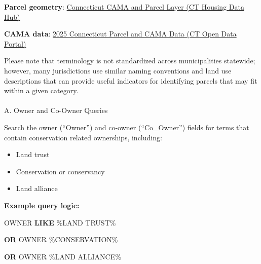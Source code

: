 \documentclass[
  letterpaper,
  DIV=11,
  numbers=noendperiod]{scrreprt}
\makeatletter
\let\oldparagraph\paragraph
\renewcommand{\paragraph}{
    \@ifstar
      \xxxParagraphStar
      \xxxParagraphNoStar
  }
\newcommand{\xxxParagraphStar}[1]{\oldparagraph*{#1}\mbox{}}
\newcommand{\xxxParagraphNoStar}[1]{\oldparagraph{#1}\mbox{}}
\newenvironment{Shaded}{\begin{snugshade}}{\end{snugshade}}
\newcommand{\KeywordTok}[1]{\textcolor[rgb]{0.00,0.23,0.31}{\textbf{#1}}}
\newcommand{\NormalTok}[1]{\textcolor[rgb]{0.00,0.23,0.31}{#1}}
\newcommand{\StringTok}[1]{\textcolor[rgb]{0.13,0.47,0.30}{#1}}
\providecommand{\tightlist}{%
  \setlength{\itemsep}{0pt}\setlength{\parskip}{0pt}}
\makeatother
\begin{document}
\textbf{Parcel geometry}:
\href{https://housingmaps.ct.gov/datasets/ctmaps::connecticut-cama-and-parcel-layer/about}{Connecticut
CAMA and Parcel Layer (CT Housing Data Hub)}

\textbf{CAMA data}:
\href{https://data.ct.gov/Local-Government/2025-Connecticut-Parcel-and-CAMA-Data/rny9-6ak2/about_data}{2025
Connecticut Parcel and CAMA Data (CT Open Data Portal)}

\begin{tcolorbox}[enhanced jigsaw, arc=.35mm, bottomrule=.15mm, breakable, colback=white, colframe=quarto-callout-warning-color-frame, left=2mm, leftrule=.75mm, opacityback=0, rightrule=.15mm, toprule=.15mm]

Please note that terminology is not standardized across municipalities
statewide; however, many jurisdictions use similar naming conventions
and land use descriptions that can provide useful indicators for
identifying parcels that may fit within a given category.

\end{tcolorbox}

\paragraph{A. Owner and Co-Owner
Queries}\label{a.-owner-and-co-owner-queries}

Search the owner (``Owner'') and co-owner (``Co\_Owner'') fields for
terms that contain conservation related ownerships, including:

\begin{itemize}
\tightlist
\item
  Land trust
\item
  Conservation or conservancy
\item
  Land alliance
\end{itemize}

\textbf{Example query logic:}

\begin{Shaded}
\begin{Highlighting}[]
\NormalTok{OWNER }\KeywordTok{LIKE} \StringTok{\textquotesingle{}\%LAND TRUST\%\textquotesingle{}}
    
\KeywordTok{OR}\NormalTok{ OWNER }\StringTok{\textquotesingle{}\%CONSERVATION\%\textquotesingle{}}

\KeywordTok{OR}\NormalTok{ OWNER }\StringTok{\textquotesingle{}\%LAND ALLIANCE\%\textquotesingle{}}
\end{Highlighting}
\end{Shaded}
\end{document}
